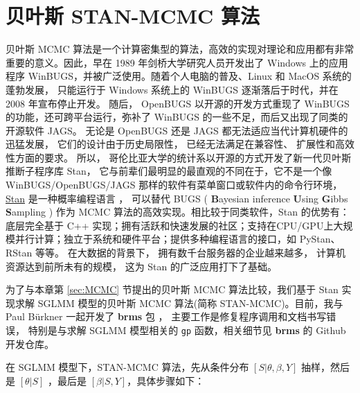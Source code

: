 \documentclass[12pt,a4paper,UTF8,twoside]{book}
\theoremstyle{definition}
\theoremstyle{definition}
\theoremstyle{definition}
\theoremstyle{remark}
\begin{document}
\hypertarget{sec:STAN-MCMC}{%
\section{贝叶斯 STAN-MCMC 算法}\label{sec:STAN-MCMC}}

贝叶斯 MCMC
算法是一个计算密集型的算法，高效的实现对理论和应用都有非常重要的意义。因此，早在
1989 年剑桥大学研究人员开发出了 Windows 上的应用程序
WinBUGS，并被广泛使用。随着个人电脑的普及、Linux 和 MacOS
系统的蓬勃发展， 只能运行于 Windows 系统上的 WinBUGS
逐渐落后于时代，并在 2008 年宣布停止开发。 随后， OpenBUGS
以开源的开发方式重现了 WinBUGS 的功能，还可跨平台运行，弥补了 WinBUGS
的一些不足，而后又出现了同类的开源软件 JAGS。 无论是 OpenBUGS 还是 JAGS
都无法适应当代计算机硬件的迅猛发展， 它们的设计由于历史局限性，
已经无法满足在兼容性、 扩展性和高效性方面的要求。 所以，
哥伦比亚大学的统计系以开源的方式开发了新一代贝叶斯推断子程序库 Stan，
它与前辈们最明显的最直观的不同在于，它不是一个像 WinBUGS/OpenBUGS/JAGS
那样的软件有菜单窗口或软件内的命令行环境，
\href{http://mc-stan.org/}{Stan} 是一种概率编程语言
\citep{Stan2017JSS}， 可以替代 BUGS ( \textbf{B}ayesian inference
\textbf{U}sing \textbf{G}ibbs \textbf{S}ampling ) \citep{BUGS2009} 作为
MCMC 算法的高效实现。相比较于同类软件，Stan 的优势有：底层完全基于 C++
实现；拥有活跃和快速发展的社区；支持在CPU/GPU上大规模并行计算；独立于系统和硬件平台；提供多种编程语言的接口，如
PyStan、 RStan 等等。 在大数据的背景下，
拥有数千台服务器的企业越来越多， 计算机资源达到前所未有的规模， 这为
Stan 的广泛应用打下了基础。

为了与本章第 \ref{sec:MCMC} 节提出的贝叶斯 MCMC 算法比较，我们基于 Stan
实现求解 SGLMM 模型的贝叶斯 MCMC 算法(简称 STAN-MCMC)。目前，我与 Paul
Bürkner 一起开发了 \textbf{brms} 包 \citep{brms2017JSS}，
主要工作是修复程序调用和文档书写错误， 特别是与求解 SGLMM 模型相关的
\texttt{gp} 函数，相关细节见 \textbf{brms} 的 Github 开发仓库。

在 SGLMM 模型下，STAN-MCMC 算法，先从条件分布 \([S|\theta,\beta,Y]\)
抽样，然后是 \([\theta|S]\) ，最后是 \([\beta|S,Y]\)，具体步骤如下：
\end{document}
